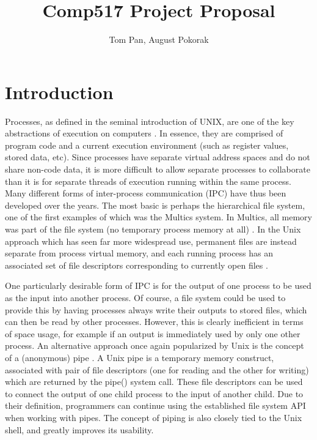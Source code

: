 \usepackage{filecontents}

\usepackage{listings}

\title{Comp517 Project Proposal}
\author{Tom Pan, August Pokorak}



\maketitle

\section{Introduction}

Processes, as defined in the seminal introduction of UNIX, are one of the key abstractions of execution on computers \cite{unix1}.  In essence, they are comprised of program code and a current execution environment (such as register values, stored data, etc).  Since processes have separate virtual address spaces and do not share non-code data, it is more difficult to allow separate processes to collaborate than it is for separate threads of execution running within the same process.  Many different forms of inter-process communication (IPC) have thus been developed over the years.  The most basic is perhaps the hierarchical file system, one of the first examples of which was the Multics system.  In Multics, all memory was part of the file system (no temporary process memory at all) \cite{multics}. In the Unix approach which has seen far more widespread use, permanent files are instead separate from process virtual memory, and each running process has an associated set of file descriptors corresponding to currently open files \cite{unix1}.

One particularly desirable form of IPC is for the output of one process to be used as the input into another process. Of course, a file system could be used to provide this by having processes always write their outputs to stored files, which can then be read by other processes.  However, this is clearly inefficient in terms of space usage, for example if an output is immediately used by only one other process. An alternative approach once again popularized by Unix is the concept of a (anonymous) pipe \cite{unix1}.  A Unix pipe is a temporary memory construct, associated with pair of file descriptors (one for reading and the other for writing) which are returned by the pipe() system call. These file descriptors can be used to connect the output of one child process to the input of another child. Due to their definition, programmers can continue using the established file system API when working with pipes. The concept of piping is also closely tied to the Unix shell, and greatly improves its usability.

